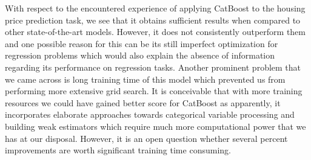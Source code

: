 With respect to the encountered experience of applying CatBoost to the housing price prediction task, we see that it obtains sufficient results when compared to other state-of-the-art models. However, it does not consistently outperform them and one possible reason for this can be its still imperfect optimization for regression problems which would also explain the absence of information regarding its performance on regression tasks. Another prominent problem that we came across is long training time of this model which prevented us from performing more extensive grid search. It is conceivable that with more training resources we could have gained better score for CatBoost as apparently, it incorporates elaborate approaches towards categorical variable processing and building weak estimators which require much more computational power that we has at our disposal. However, it is an open question whether several percent improvements are worth significant training time consuming.